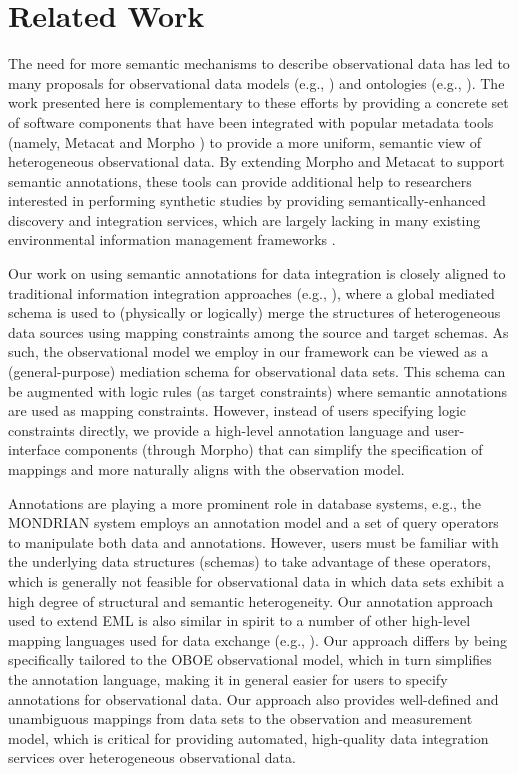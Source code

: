 
\section{Related Work}
\label{sec:related}

The need for more semantic mechanisms to describe observational data
has led to many proposals for observational data models (e.g.,
\cite{om, tarboton07:_cuahs_commun_obser_data_model,netcdf}) and
ontologies (e.g.,
\cite{fox09:_ontol,sweet,mungall07:_repres_phenot_in_owl}).  The work
presented here is complementary to these efforts by providing a
concrete set of software components that have been integrated with
popular metadata tools (namely, Metacat
\cite{metacat02:_manag_heter_ecolog_data_using_morph} and Morpho
\cite{berkley01:_metac}) to provide a more uniform, semantic view of
heterogeneous observational data. By extending Morpho and Metacat to
support semantic annotations, these tools can provide additional help
to researchers interested in performing synthetic studies by providing
semantically-enhanced discovery and integration services, which are
largely lacking in many existing environmental information management
frameworks \cite{jones_new_2006}.

Our work on using semantic annotations for data integration is closely
aligned to traditional information integration approaches (e.g.,
\cite{kolaitis05}), where a global mediated
schema is used to (physically or logically) merge the structures of
heterogeneous data sources using mapping constraints among the source
and target schemas. As such, the observational model we employ in our
framework can be viewed as a (general-purpose) mediation schema for
observational data sets.  This schema can be augmented with logic
rules (as target constraints) where semantic annotations are used as
mapping constraints. However, instead of users specifying logic
constraints directly, we provide a high-level annotation language and
user-interface components (through Morpho) that can simplify the
specification of mappings and more naturally aligns with the
observation model.

Annotations are playing a more prominent role in database systems,
e.g., the MONDRIAN system \cite{GeertsKM06} employs an annotation
model and a set of query operators to manipulate both data and
annotations.  However, users must be familiar with the underlying data
structures (schemas) to take advantage of these operators, which is
generally not feasible for observational data in which data sets
exhibit a high degree of structural and semantic heterogeneity. Our
annotation approach used to extend EML is also similar in spirit to a
number of other high-level mapping languages used for data exchange
(e.g., \cite{fagin09:_clio,an06:_build_seman_mappin_datab_ontol}). Our
approach differs by being specifically tailored to the OBOE
observational model, which in turn simplifies the annotation language,
making it in general easier for users to specify annotations for
observational data. Our approach also provides well-defined and
unambiguous mappings from data sets to the observation and measurement
model, which is critical for providing automated, high-quality data
integration services over heterogeneous observational data.

